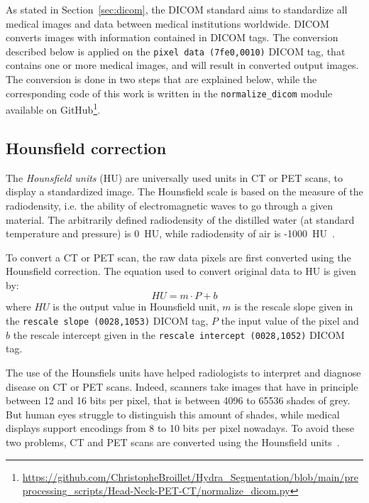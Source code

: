 As stated in Section~\ref{sec:dicom}, the DICOM standard aims to standardize all medical images and data between medical institutions worldwide. DICOM converts images with information contained in DICOM tags. The conversion described below is applied on the \texttt{pixel data (7fe0,0010)} DICOM tag, that contains one or more medical images, and will result in converted output images. The conversion is done in two steps that are explained below, while the corresponding code of this work is written in the \texttt{normalize\_dicom} module available on GitHub\footnote{\url{https://github.com/ChristopheBroillet/Hydra_Segmentation/blob/main/preprocessing_scripts/Head-Neck-PET-CT/normalize_dicom.py}}.

\subsection{Hounsfield correction}
The \emph{Hounsfield units} (HU) are universally used units in CT or PET scans, to display a standardized image. The Hounsfield scale is based on the measure of the radiodensity, i.e. the ability of electromagnetic waves to go through a given material. The arbitrarily defined radiodensity of the distilled water (at standard temperature and pressure) is 0~HU, while radiodensity of air is -1000~HU~\cite{schneider_calibration_1996}.

To convert a CT or PET scan, the raw data pixels are first converted using the Hounsfield correction. The equation used to convert original data to HU is given by:
\begin{equation}
  HU = m \cdot P + b
\end{equation}
where $HU$ is the output value in Hounsfield unit, $m$ is the rescale slope given in the \texttt{rescale slope (0028,1053)} DICOM tag, $P$ the input value of the pixel and $b$ the rescale intercept given in the \texttt{rescale intercept (0028,1052)} DICOM tag.

The use of the Hounsfiels units have helped radiologists to interpret and diagnose disease on CT or PET scans. Indeed, scanners take images that have in principle between 12 and 16 bits per pixel, that is between 4096 to 65536 shades of grey. But human eyes struggle to distinguish this amount of shades, while medical displays support encodings from 8 to 10 bits per pixel nowadays. To avoid these two problems, CT and PET scans are converted using the Hounsfield units~\cite{kimpe_increasing_2007}.

